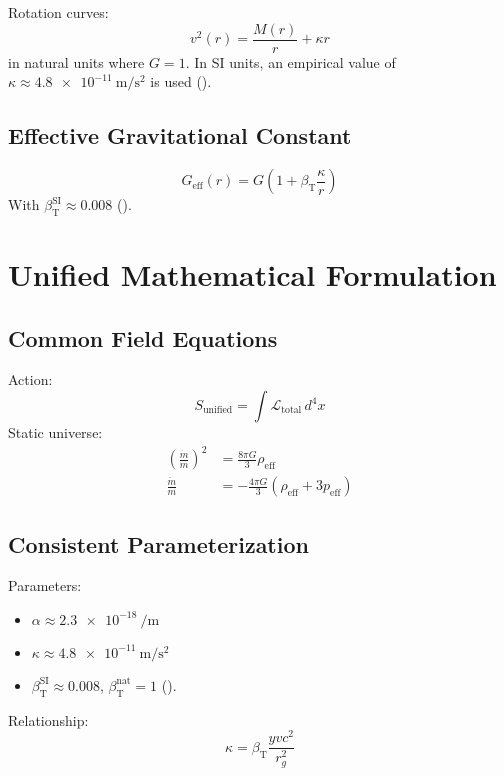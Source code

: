 \documentclass[a4paper,12pt]{article}
\theoremstyle{definition}
\theoremstyle{remark}
\newcommand{\betaT}{\beta_{\text{T}}}
\begin{document}
Rotation curves:
\begin{equation}
	v^2(r) = \frac{M(r)}{r} + \kappa r
\end{equation}
in natural units where \(G = 1\). In SI units, an empirical value of \(\kappa \approx \SI{4.8e-11}{\meter\per\second\squared}\) is used (\cite{pascher_galaxies_2025}).
	\subsection{Effective Gravitational Constant}
	
	\begin{equation}
		G_{\text{eff}}(r) = G \left(1 + \betaT \frac{\kappa}{r}\right)
	\end{equation}
	With \(\betaT^{\text{SI}} \approx 0.008\) (\cite{pascher_params_2025}).
	
	\section{Unified Mathematical Formulation}
	
	\subsection{Common Field Equations}
	
	Action:
	\begin{equation}
		S_\text{unified} = \int \mathcal{L}_\text{total} \, d^4x
	\end{equation}
	Static universe:
	\begin{align}
		\left(\frac{\dot{m}}{m}\right)^2 &= \frac{8\pi G}{3} \rho_{\text{eff}} \\
		\frac{\ddot{m}}{m} &= -\frac{4\pi G}{3} (\rho_{\text{eff}} + 3p_{\text{eff}})
	\end{align}
	

	\subsection{Consistent Parameterization}
	
	Parameters:
	\begin{itemize}
		\item \(\alpha \approx \SI{2.3e-18}{\per\meter}\)
		\item \(\kappa \approx \SI{4.8e-11}{\meter\per\second\squared}\)
		\item \(\betaT^{\text{SI}} \approx 0.008\), \(\betaT^{\text{nat}} = 1\) (\cite{pascher_params_2025}).
	\end{itemize}
	Relationship:
	\begin{equation}
		\kappa = \betaT \frac{y v c^2}{r_g^2}
	\end{equation}
	
\end{document}
